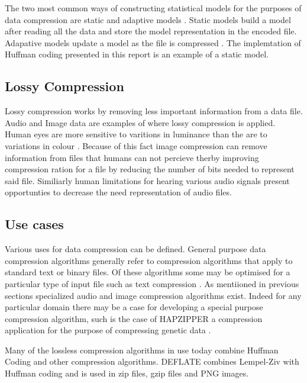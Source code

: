 \doublespacing
\singlespacing
The two most common ways of constructing statistical models for the purposes of data compression are static and adaptive models . Static models build a model after reading all the data and store the model representation in the encoded file. Adapative models update a model as the file is compressed \cite{WikiLossless}. The implemtation of Huffman coding presented in this report is an example of a static model.


\doublespacing
\singlespacing
\subsection{Lossy Compression}


\singlespacing


Lossy compression works by removing less important information from a data file. Audio and Image data are examples of where lossy compression is applied. Human eyes are more sensitive to varitions in luminance than the are to variations in colour \cite{WikiDataCompression}. Because of this fact image compression can remove information from files that humans can not percieve therby improving compression ration for a file by reducing the number of bits needed to represent said file. Similiarly human limitations for hearing various audio signals present opportunties to decrease the need representation of audio files.


\doublespacing
\singlespacing
\subsection{Use cases}


\singlespacing


Various uses for data compression can be defined. General purpose data compression algorithms generally refer to compression algorithms that apply to standard text or binary files. Of these algorithms some may be optimised for a particular type of input file such as text compression . As mentiioned in previous sections specialized audio and image compression algorithms exist. Indeed for any particular domain there may be a case for developing a special purpose compression algorithm, such is the case of HAPZIPPER a compression application for the purpose of compressing genetic data \cite{WikiLossless}.


\doublespacing
\singlespacing


Many of the lossless compression algorithms in use today combine Huffman Coding and other compression algorithms. DEFLATE combines Lempel-Ziv with Huffman coding and is used in zip files, gzip files and PNG images. 

